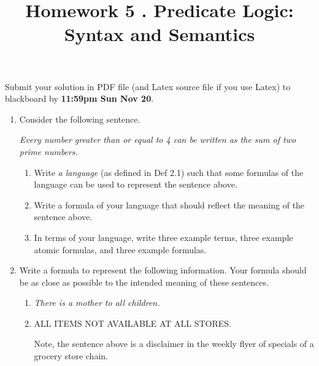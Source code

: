 \documentclass[12pt, letterpaper]{article}
\date{}
\newcommand{\hwnumber} {
    5
}
\newcommand{\hwtitle} {
   Predicate Logic: Syntax and Semantics
}
\newcommand{\duedate}{
    11:59pm Sun Nov 20}
\begin{document}
\newcommand{\hide}[1]{}
\newcommand{\otherquestions}[1]{}
\newcommand{\set}[1]{\{#1\}}
\newcommand{\pg}[1]{{\tt #1}}
\newtheorem{definition}{Definition}
\newcommand{\emptyclause}{\Box}




\title{{\bf Homework \hwnumber.} \hwtitle}

\date{}
\maketitle



\noindent 
Submit your solution in PDF file (and Latex source  file if you use Latex) to blackboard by 
{\bf \duedate}. 

\begin{enumerate}
\item Consider the following sentence.

{\em Every number greater than or equal to 4 can be written
        as the sum of two prime numbers.}

  \begin{enumerate}
    \item Write {\em a language} (as defined in Def 2.1) such that
    some formulas of the language can be used to represent the sentence above.

    \item Write a formula of your language that should reflect the
    meaning of the sentence above.

    \item In terms of your language, write three example terms, three example atomic
    formulas, and three example formulas.
  \end{enumerate}

\item Write a formula to represent the following information. Your formula should be as close as possible
to the intended meaning of these sentences.

\begin{enumerate}
\item {\em There is a mother to all children.}

\item ALL ITEMS NOT AVAILABLE AT ALL STORES.

Note, the sentence above is a disclaimer in the weekly flyer of
specials of a grocery store chain.
\end{enumerate}


\end{enumerate}
\end{document}
